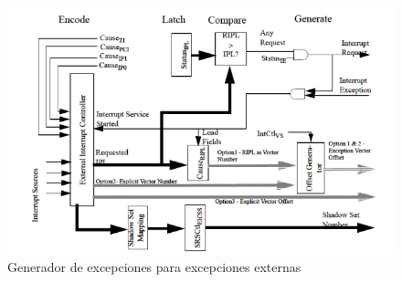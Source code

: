 \begin{figure}[h]
    \centering
    \includegraphics[width=\textwidth]{images/mips/mips-exception-generator}
    \caption{Generador de excepciones para excepciones externas}
    \label{fig:mips-exception-generator}
\end{figure}
